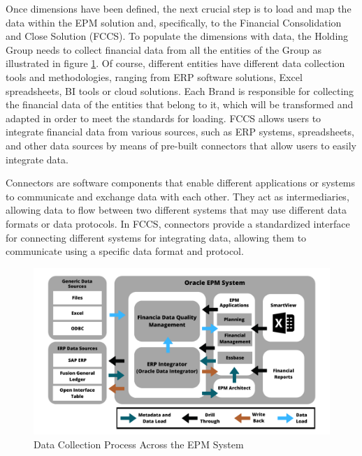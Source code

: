 \documentclass[12pt,a4paper,openright,twoside]{book}
\begin{document}
Once dimensions have been defined, the next crucial step is to load and map the data within the EPM solution and, specifically, to the Financial Consolidation and Close Solution (FCCS). 
%
To populate the dimensions with data, the Holding Group needs to collect financial data from all the entities of the Group as illustrated in figure \ref{fig:dataload}.
%
Of course, different entities have different data collection tools and methodologies, ranging from ERP software solutions, Excel spreadsheets, BI tools or cloud solutions.
%
Each Brand is responsible for collecting the financial data of the entities that belong to it, which will be transformed and adapted in order to meet the standards for loading.  
%
FCCS allows users to integrate financial data from various sources, such as ERP systems, spreadsheets, and other data sources by means of pre-built connectors that allow users to easily integrate data.

Connectors are software components that enable different applications or systems to communicate and exchange data with each other. 
%
They act as intermediaries, allowing data to flow between two different systems that may use different data formats or data protocols.
%
In FCCS, connectors provide a standardized interface for connecting different systems for integrating data, allowing them to communicate using a specific data format and protocol.

\begin{figure}[ht]
	\centering
	\includegraphics[width=\linewidth]{figures/data-load.pdf}
	\caption{Data Collection Process Across the EPM System}
	\label{fig:dataload}
\end{figure}
\end{document}
